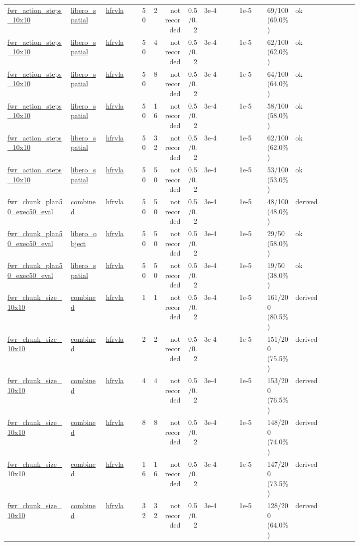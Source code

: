 \begin{tiny}
\begin{longtable}{@{}p{0.18\linewidth}p{0.10\linewidth}p{0.10\linewidth}rrrrp{0.10\linewidth}p{0.08\linewidth}p{0.08\linewidth}p{0.11\linewidth}p{0.07\linewidth}@{}}
\url{fwr_action_steps_10x10} & \url{libero_spatial} & \url{hfrvla} & 50 & 2 & not recorded & 0.5/0.2 & 3e-4 & 1e-5 & 69/100 (69.0\%) & ok \\
\url{fwr_action_steps_10x10} & \url{libero_spatial} & \url{hfrvla} & 50 & 4 & not recorded & 0.5/0.2 & 3e-4 & 1e-5 & 62/100 (62.0\%) & ok \\
\url{fwr_action_steps_10x10} & \url{libero_spatial} & \url{hfrvla} & 50 & 8 & not recorded & 0.5/0.2 & 3e-4 & 1e-5 & 64/100 (64.0\%) & ok \\
\url{fwr_action_steps_10x10} & \url{libero_spatial} & \url{hfrvla} & 50 & 16 & not recorded & 0.5/0.2 & 3e-4 & 1e-5 & 58/100 (58.0\%) & ok \\
\url{fwr_action_steps_10x10} & \url{libero_spatial} & \url{hfrvla} & 50 & 32 & not recorded & 0.5/0.2 & 3e-4 & 1e-5 & 62/100 (62.0\%) & ok \\
\url{fwr_action_steps_10x10} & \url{libero_spatial} & \url{hfrvla} & 50 & 50 & not recorded & 0.5/0.2 & 3e-4 & 1e-5 & 53/100 (53.0\%) & ok \\
\url{fwr_chunk_plan50_exec50_eval} & \url{combined} & \url{hfrvla} & 50 & 50 & not recorded & 0.5/0.2 & 3e-4 & 1e-5 & 48/100 (48.0\%) & derived \\
\url{fwr_chunk_plan50_exec50_eval} & \url{libero_object} & \url{hfrvla} & 50 & 50 & not recorded & 0.5/0.2 & 3e-4 & 1e-5 & 29/50 (58.0\%) & ok \\
\url{fwr_chunk_plan50_exec50_eval} & \url{libero_spatial} & \url{hfrvla} & 50 & 50 & not recorded & 0.5/0.2 & 3e-4 & 1e-5 & 19/50 (38.0\%) & ok \\
\url{fwr_chunk_size_10x10} & \url{combined} & \url{hfrvla} & 1 & 1 & not recorded & 0.5/0.2 & 3e-4 & 1e-5 & 161/200 (80.5\%) & derived \\
\url{fwr_chunk_size_10x10} & \url{combined} & \url{hfrvla} & 2 & 2 & not recorded & 0.5/0.2 & 3e-4 & 1e-5 & 151/200 (75.5\%) & derived \\
\url{fwr_chunk_size_10x10} & \url{combined} & \url{hfrvla} & 4 & 4 & not recorded & 0.5/0.2 & 3e-4 & 1e-5 & 153/200 (76.5\%) & derived \\
\url{fwr_chunk_size_10x10} & \url{combined} & \url{hfrvla} & 8 & 8 & not recorded & 0.5/0.2 & 3e-4 & 1e-5 & 148/200 (74.0\%) & derived \\
\url{fwr_chunk_size_10x10} & \url{combined} & \url{hfrvla} & 16 & 16 & not recorded & 0.5/0.2 & 3e-4 & 1e-5 & 147/200 (73.5\%) & derived \\
\url{fwr_chunk_size_10x10} & \url{combined} & \url{hfrvla} & 32 & 32 & not recorded & 0.5/0.2 & 3e-4 & 1e-5 & 128/200 (64.0\%) & derived \\

\end{longtable}
\end{tiny}
